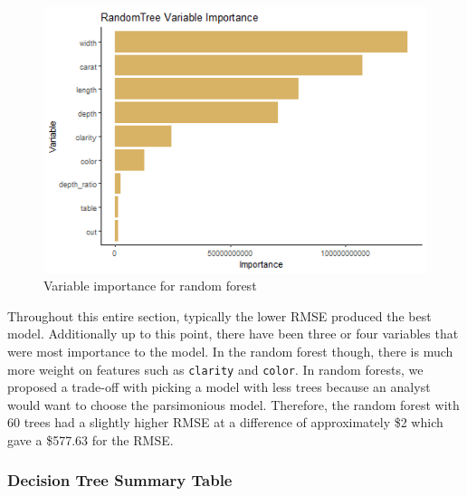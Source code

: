 \documentclass[
  paper=a4,
  ,captions=tableheading
]{scrartcl}
\begin{document}
\begin{figure}[H]

{\centering \includegraphics[width=0.5\linewidth,]{Diamonds_PDF_files/figure-latex/RF Variable Importance-1} 

}

\caption{Variable importance for random forest}\label{fig:RF Variable Importance}
\end{figure}

Throughout this entire section, typically the lower RMSE produced the
best model. Additionally up to this point, there have been three or four
variables that were most importance to the model. In the random forest
though, there is much more weight on features such as \texttt{clarity}
and \texttt{color}. In random forests, we proposed a trade-off with
picking a model with less trees because an analyst would want to choose
the parsimonious model. Therefore, the random forest with 60 trees had a
slightly higher RMSE at a difference of approximately \$2 which gave a
\$577.63 for the RMSE.

\hypertarget{decision-tree-summary-table}{%
\subsubsection{Decision Tree Summary
Table}\label{decision-tree-summary-table}}
\end{document}
